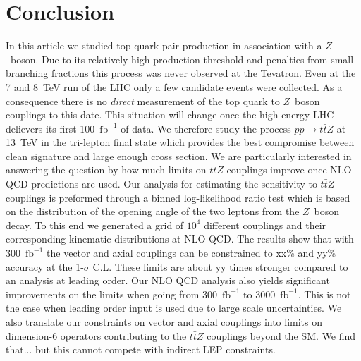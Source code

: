 \documentclass[preprint]{JHEP3}
\def\ttbZ{t\bar{t}Z}
\def\invfb {\mathrm{fb}^{-1}}
\begin{document}
\section{Conclusion}
In this article we studied top quark pair production in association with a $Z$~boson.
Due to its relatively high production threshold and 
penalties from small branching fractions 
this process was never observed at the Tevatron.
Even at the 7 and 8~TeV run of the LHC only a few candidate events were collected.
As a consequence there is no {\it direct} measurement of the top quark to $Z$~boson couplings to this date. 
This situation will change once the high energy LHC delievers its first 100~$\invfb$ of data.
We therefore study the process $pp\to\ttbZ$ at 13~TeV in the tri-lepton final state  
which provides the best compromise between clean signature and large enough cross section. 
We are particularly interested in answering the question by how much limits on
$\ttbZ$ couplings improve once NLO QCD predictions are used.
Our analysis for estimating the sensitivity to $\ttbZ$-couplings is preformed through a binned log-likelihood ratio test which is based on the 
distribution of the opening angle of the two leptons from the $Z$~boson decay.
To this end we generated a grid of $10^4$ different couplings and their corresponding kinematic distributions at NLO QCD. 
The results show that with 300~$\invfb$ the vector and axial couplings can be constrained to xx\% and yy\% accuracy at the 1-$\sigma$ C.L.
These limits are about yy times stronger compared to an analysis at leading order.
Our NLO QCD analysis also yields significant improvements on the limits when going from 300~$\invfb$ to 3000~$\invfb$.
This is not the case when leading order input is used due to large scale uncertainties.
We also translate our constraints on vector and axial couplings into limits on dimension-6 operators contributing to the $\ttbZ$ couplings beyond the SM.
We find that... but this cannot compete with indirect LEP constraints.
\end{document}
